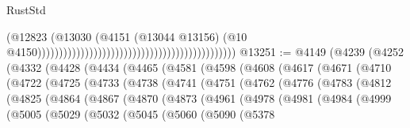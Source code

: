 \begin{lexlean}{RustStd}
\begin{coremodule}
                                                                                        (@12823
                                                                                          (@13030
                                                                                            (@4151
                                                                                              (@13044
                                                                                                @13156)
                                                                                              (@10
                                                                                                @4150))))))))))))))))))))))))))))))))))))))))))))))
@13251 := @4149
    (@4239
      (@4252
        (@4332
          (@4428
            (@4434
              (@4465
                (@4581
                  (@4598
                    (@4608
                      (@4617
                        (@4671
                          (@4710
                            (@4722
                              (@4725
                                (@4733
                                  (@4738
                                    (@4741
                                      (@4751
                                        (@4762
                                          (@4776
                                            (@4783
                                              (@4812
                                                (@4825
                                                  (@4864
                                                    (@4867
                                                      (@4870
                                                        (@4873
                                                          (@4961
                                                            (@4978
                                                              (@4981
                                                                (@4984
                                                                  (@4999
                                                                    (@5005
                                                                      (@5029
                                                                        (@5032
                                                                          (@5045
                                                                            (@5060
                                                                              (@5090
                                                                                (@5378

\end{coremodule}
\end{lexlean}
